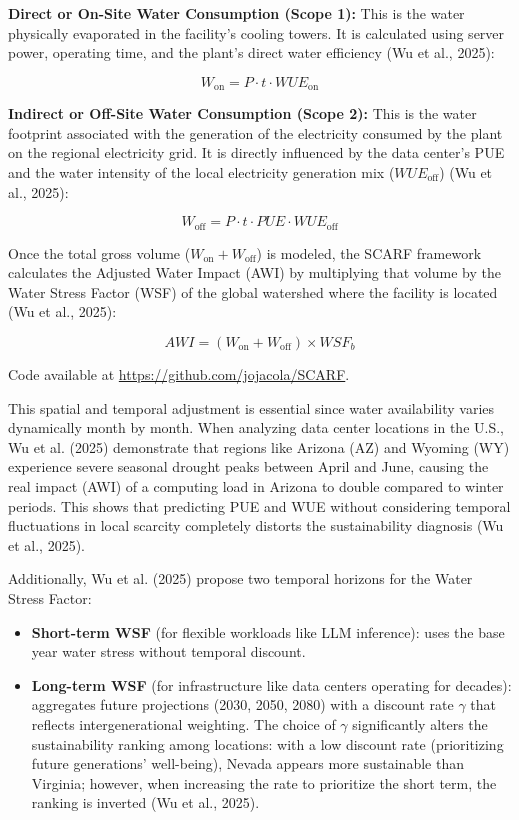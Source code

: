 \documentclass[conference]{IEEEtran}
\begin{document}
\textbf{Direct or On-Site Water Consumption (Scope 1):} This is the water physically evaporated in the facility's cooling towers. It is calculated using server power, operating time, and the plant's direct water efficiency (Wu et al., 2025):

\begin{equation}
W_{\text{on}} = P \cdot t \cdot WUE_{\text{on}}
\end{equation}

\textbf{Indirect or Off-Site Water Consumption (Scope 2):} This is the water footprint associated with the generation of the electricity consumed by the plant on the regional electricity grid. It is directly influenced by the data center's PUE and the water intensity of the local electricity generation mix ($WUE_{\text{off}}$) (Wu et al., 2025):

\begin{equation}
W_{\text{off}} = P \cdot t \cdot PUE \cdot WUE_{\text{off}}
\end{equation}

Once the total gross volume ($W_{\text{on}} + W_{\text{off}}$) is modeled, the SCARF framework calculates the Adjusted Water Impact (AWI) by multiplying that volume by the Water Stress Factor (WSF) of the global watershed where the facility is located (Wu et al., 2025):

\begin{equation}
AWI = (W_{\text{on}} + W_{\text{off}}) \times WSF_b
\end{equation}

Code available at \url{https://github.com/jojacola/SCARF}.

This spatial and temporal adjustment is essential since water availability varies dynamically month by month. When analyzing data center locations in the U.S., Wu et al. (2025) demonstrate that regions like Arizona (AZ) and Wyoming (WY) experience severe seasonal drought peaks between April and June, causing the real impact (AWI) of a computing load in Arizona to double compared to winter periods. This shows that predicting PUE and WUE without considering temporal fluctuations in local scarcity completely distorts the sustainability diagnosis (Wu et al., 2025).

Additionally, Wu et al. (2025) propose two temporal horizons for the Water Stress Factor:

\begin{itemize}
\item \textbf{Short-term WSF} (for flexible workloads like LLM inference): uses the base year water stress without temporal discount.
\item \textbf{Long-term WSF} (for infrastructure like data centers operating for decades): aggregates future projections (2030, 2050, 2080) with a discount rate $\gamma$ that reflects intergenerational weighting. The choice of $\gamma$ significantly alters the sustainability ranking among locations: with a low discount rate (prioritizing future generations' well-being), Nevada appears more sustainable than Virginia; however, when increasing the rate to prioritize the short term, the ranking is inverted (Wu et al., 2025).
\end{itemize}
\end{document}

